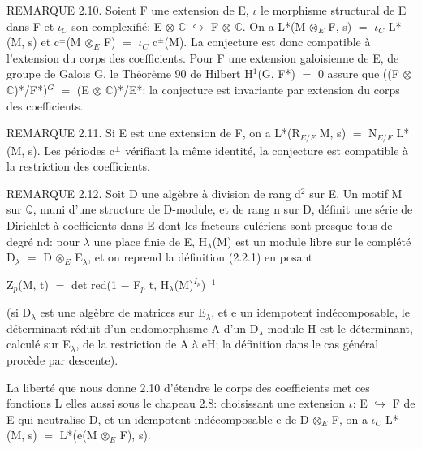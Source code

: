 \documentclass[10pt,twoside]{article}
\begin{document}
REMARQUE 2.10. Soient F une extension de E, \ensuremath{ι} le morphisme structural de E dans F et \ensuremath{ι}\ensuremath{_{C}} son complexifié: E \ensuremath{⊗} \ensuremath{ℂ} \ensuremath{↪} F \ensuremath{⊗} \ensuremath{ℂ}. On a L*(M \ensuremath{⊗}\ensuremath{_{E}} F, s) \ensuremath{=} \ensuremath{ι}\ensuremath{_{C}} L*(M, s) et c\ensuremath{^{±}}(M \ensuremath{⊗}\ensuremath{_{E}} F) \ensuremath{=} \ensuremath{ι}\ensuremath{_{C}} c\ensuremath{^{±}}(M). La conjecture est donc compatible à l’extension du corps des coefficients. Pour F une extension galoisienne de E, de groupe de Galois G, le Théorème 90 de Hilbert H\ensuremath{^{1}}(G, F*) \ensuremath{=} 0 assure que ((F \ensuremath{⊗} \ensuremath{ℂ})*/F*)\ensuremath{^{G}} \ensuremath{=} (E \ensuremath{⊗} \ensuremath{ℂ})*/E*: la conjecture est invariante par extension du corps des coefficients.\par
REMARQUE 2.11. Si E est une extension de F, on a L*(R\ensuremath{_{E/F}} M, s) \ensuremath{=} N\ensuremath{_{E/F}} L*(M, s). Les périodes c\ensuremath{^{±}} vérifiant la même identité, la conjecture est compatible à la restriction des coefficients.\par
REMARQUE 2.12. Soit D une algèbre à division de rang d\ensuremath{^{2}} sur E. Un motif M sur \ensuremath{ℚ}, muni d’une structure de D-module, et de rang n sur D, définit une série de Dirichlet à coefficients dans E dont les facteurs eulériens sont presque tous de degré nd: pour \ensuremath{λ} une place finie de E, H\ensuremath{_{λ}}(M) est un module libre sur le complété D\ensuremath{_{λ}} \ensuremath{=} D \ensuremath{⊗}\ensuremath{_{E}} E\ensuremath{_{λ}}, et on reprend la définition (2.2.1) en posant\par
Z\ensuremath{_{p}}(M, t) \ensuremath{=} det red(1 \ensuremath{−} F\ensuremath{_{p}} t, H\ensuremath{_{λ}}(M)\ensuremath{^{I_p}})\ensuremath{^{−1}}\par
(si D\ensuremath{_{λ}} est une algèbre de matrices sur E\ensuremath{_{λ}}, et e un idempotent indécomposable, le déterminant réduit d’un endomorphisme A d’un D\ensuremath{_{λ}}-module H est le déterminant, calculé sur E\ensuremath{_{λ}}, de la restriction de A à eH; la définition dans le cas général procède par descente).\par
La liberté que nous donne 2.10 d’étendre le corps des coefficients met ces fonctions L elles aussi sous le chapeau 2.8: choisissant une extension \ensuremath{ι}: E \ensuremath{↪} F de E qui neutralise D, et un idempotent indécomposable e de D \ensuremath{⊗}\ensuremath{_{E}} F, on a \ensuremath{ι}\ensuremath{_{C}} L*(M, s) \ensuremath{=} L*(e(M \ensuremath{⊗}\ensuremath{_{E}} F), s).\par
\end{document}
